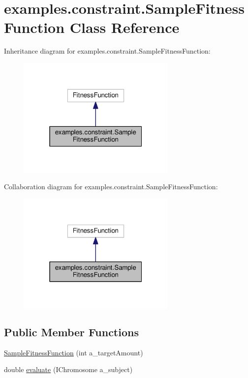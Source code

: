 \hypertarget{classexamples_1_1constraint_1_1_sample_fitness_function}{\section{examples.\-constraint.\-Sample\-Fitness\-Function Class Reference}
\label{classexamples_1_1constraint_1_1_sample_fitness_function}
}


Inheritance diagram for examples.\-constraint.\-Sample\-Fitness\-Function\-:
\nopagebreak
\begin{figure}[H]
\begin{center}
\leavevmode
\includegraphics[width=220pt]{classexamples_1_1constraint_1_1_sample_fitness_function__inherit__graph}
\end{center}
\end{figure}


Collaboration diagram for examples.\-constraint.\-Sample\-Fitness\-Function\-:
\nopagebreak
\begin{figure}[H]
\begin{center}
\leavevmode
\includegraphics[width=220pt]{classexamples_1_1constraint_1_1_sample_fitness_function__coll__graph}
\end{center}
\end{figure}
\subsection*{Public Member Functions}
\begin{DoxyCompactItemize}
\item 
\hyperlink{classexamples_1_1constraint_1_1_sample_fitness_function_af8b0de1c543fd14655723e1dec2a2cbc}{Sample\-Fitness\-Function} (int a\-\_\-target\-Amount)
\item 
double \hyperlink{classexamples_1_1constraint_1_1_sample_fitness_function_a3e9f69e8a2f0d3ca77aaa790a699cf24}{evaluate} (I\-Chromosome a\-\_\-subject)
\end{DoxyCompactItemize}
